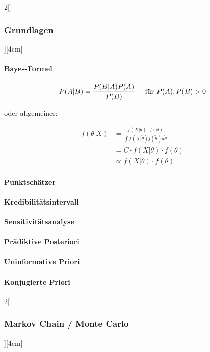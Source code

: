 \documentclass[8pt]{extarticle}
\begin{document}
\begin{multicols}{2}[\subsubsection{Grundlagen}][4cm] 

  \paragraph{Bayes-Formel}
  $$P(A|B)=\frac{P(B|A)P(A)}{P(B)} \hspace{0.5cm} \text{für } P(A), P(B) > 0$$

  \center  oder allgemeiner:
  
\begin{align*}
  f(\theta | X) &= \frac{f(X | \theta ) \cdot f(\theta)}{\int f(X|\tilde{\theta}) f(\tilde{\theta})  d \tilde{\theta}}\\
  &= C \cdot f(X | \theta ) \cdot f(\theta) \\
  &\propto f(X | \theta ) \cdot f(\theta)
\end{align*}


\paragraph{Punktschätzer}

\paragraph{Kredibilitätsintervall}

\paragraph{Sensitivitätsanalyse}

\paragraph{Prädiktive Posteriori}

\paragraph{Uninformative Priori}

\paragraph{Konjugierte Priori}


\end{multicols}


\begin{multicols}{2}[\subsubsection{Markov Chain / Monte Carlo}][4cm]



\end{multicols}
\end{document}
